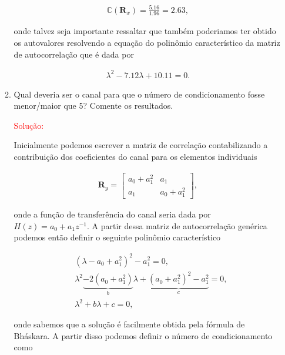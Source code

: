 \documentclass[a4paper,10pt]{article}
\begin{document}
\begin{enumerate}
\begin{enumerate}
						\begin{align}
							\mathbb{C} (\mathbf{R}_{x}) = \frac{5.16}{1.96} = 2.63,
						\end{align}

						onde talvez seja importante ressaltar que também poderiamos ter obtido os autovalores resolvendo a equação do polinômio
						característico da matriz de autocorrelação que é dada por

						\begin{align}
							\lambda^{2} - 7.12 \lambda + 10.11 = 0. 
						\end{align}

					\item Qual deveria ser o canal para que o número de condicionamento fosse menor/maior que 5?
					Comente os resultados.
					
						\textcolor{red}{Solução:}
						
						Inicialmente podemos escrever a matriz de correlação contabilizando a contribuição dos coeficientes do canal para os elementos individuais
						
						\begin{align}
							\mathbf{R}_{y} =
							\begin{bmatrix}
								a_{0} + a^{2}_{1} & a_{1}\\
								a_{1} & a_{0} + a^{2}_{1}
							\end{bmatrix},
						\end{align}

						onde a função de transferência do canal seria dada por $H(z) = a_{0} + a_{1}z^{-1}$. A partir dessa matriz de autocorrelação genérica podemos então 
						definir o seguinte polinômio característico

						\begin{align}
							&(\lambda - a_{0} + a^{2}_{1})^{2} - a^{2}_{1} = 0, \\
							&\lambda^{2} \underbrace{- 2 (a_{0} + a^{2}_{1})}_{b} \lambda + \underbrace{(a_{0} + a^{2}_{1})^{2} - a^{2}_{1}}_{c} = 0, \\
							&\lambda^{2} + b \lambda + c = 0,
						\end{align}

						onde sabemos que a solução é facilmente obtida pela fórmula de Bháskara. A partir disso podemos definir o número de condicionamento como


\end{enumerate}
\end{enumerate}
\end{document}
